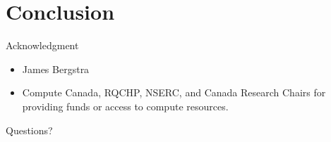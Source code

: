 \documentclass[utf8x,xcolor=pdftex,dvipsnames,table]{beamer}
\begin{document}

\section{Conclusion}

\begin{frame}{Acknowledgment}
\begin{itemize}
\item James Bergstra
\item Compute Canada, RQCHP, NSERC, and Canada Research Chairs for providing funds or access to compute resources.
\end{itemize}
\end{frame}

\begin{frame}
\begin{center}
\Huge
Questions?
\end{center}
\end{frame}
\end{document}

